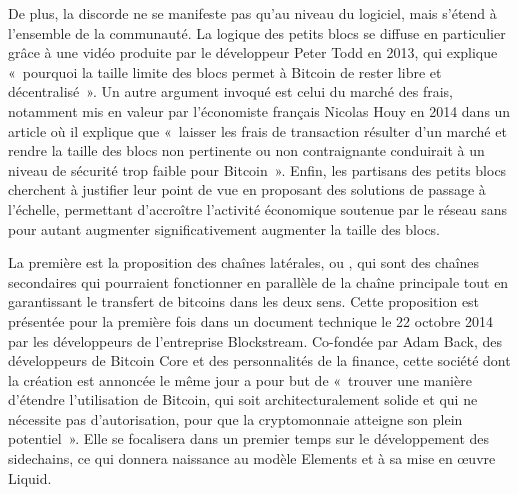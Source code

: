 De plus, la discorde ne se manifeste pas qu'au niveau du logiciel, mais s'étend à l'ensemble de la communauté. La logique des petits blocs se diffuse en particulier grâce à une vidéo produite par le développeur Peter Todd en 2013, qui explique «~pourquoi la taille limite des blocs permet à Bitcoin de rester libre et décentralisé~». Un autre argument invoqué est celui du marché des frais, notamment mis en valeur par l'économiste français Nicolas Houy en 2014 dans un article où il explique que «~laisser les frais de transaction résulter d'un marché et rendre la taille des blocs non pertinente ou non contraignante conduirait à un niveau de sécurité trop faible pour Bitcoin~». Enfin, les partisans des petits blocs cherchent à justifier leur point de vue en proposant des solutions de passage à l'échelle, permettant d'accroître l'activité économique soutenue par le réseau sans pour autant augmenter significativement augmenter la taille des blocs.

La première est la proposition des chaînes latérales, ou , qui sont des chaînes secondaires qui pourraient fonctionner en parallèle de la chaîne principale tout en garantissant le transfert de bitcoins dans les deux sens. Cette proposition est présentée pour la première fois dans un document technique le 22 octobre 2014 par les développeurs de l'entreprise Blockstream. Co-fondée par Adam Back, des développeurs de Bitcoin Core et des personnalités de la finance, cette société dont la création est annoncée le même jour a pour but de «~trouver une manière d'étendre l'utilisation de Bitcoin, qui soit architecturalement solide et qui ne nécessite pas d'autorisation, pour que la cryptomonnaie atteigne son plein potentiel~». Elle se focalisera dans un premier temps sur le développement des sidechains, ce qui donnera naissance au modèle Elements et à sa mise en œuvre Liquid.


